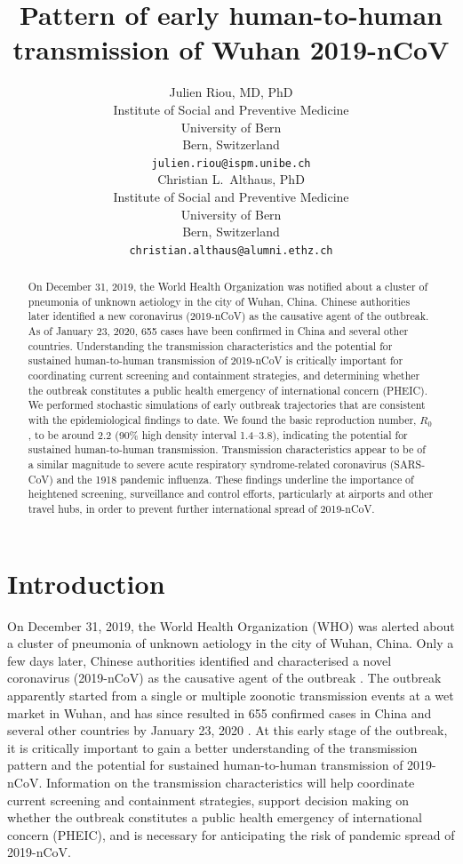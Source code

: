 \documentclass[a4]{article}
\title{Pattern of early human-to-human transmission of Wuhan 2019-nCoV}
\author{
   Julien Riou, MD, PhD \\
  Institute of Social and Preventive Medicine\\
  University of Bern\\
  Bern, Switzerland \\
  \texttt{julien.riou@ispm.unibe.ch} \\
  \And
Christian L.~Althaus, PhD \\
Institute of Social and Preventive Medicine\\
University of Bern\\
Bern, Switzerland \\
\texttt{christian.althaus@alumni.ethz.ch}
}
\begin{document}
\maketitle

\begin{abstract}
On December 31, 2019, the World Health Organization was notified about a cluster of pneumonia of unknown aetiology in the city of Wuhan, China. Chinese authorities later identified a new coronavirus (2019-nCoV) as the causative agent of the outbreak. As of January 23, 2020, 655 cases have been confirmed in China and several other countries. Understanding the transmission characteristics and the potential for sustained human-to-human transmission of 2019-nCoV is critically important for coordinating current screening and containment strategies, and determining whether the outbreak constitutes a public health emergency of international concern (PHEIC). We performed stochastic simulations of early outbreak trajectories that are consistent with the epidemiological findings to date. We found the basic reproduction number, $R_0$, to be around 2.2 (90\% high density interval 1.4--3.8), indicating the potential for sustained human-to-human transmission. Transmission characteristics appear to be of a similar magnitude to severe acute respiratory syndrome-related coronavirus (SARS-CoV) and the 1918 pandemic influenza. These findings underline the importance of heightened screening, surveillance and control efforts, particularly at airports and other travel hubs, in order to prevent further international spread of 2019-nCoV.
\end{abstract}

\section*{Introduction}

On December 31, 2019, the World Health Organization (WHO) was alerted about a cluster of pneumonia of unknown aetiology in the city of Wuhan, China\cite{who1}. Only a few days later, Chinese authorities identified and characterised a novel coronavirus (2019-nCoV) as the causative agent of the outbreak \cite{Shi:2020}. The outbreak apparently started from a single or multiple zoonotic transmission events at a wet market in Wuhan, and has since resulted in 655 confirmed cases in China and several other countries by January 23, 2020 \cite{wiki}. At this early stage of the outbreak, it is critically important to gain a better understanding of the transmission pattern and the potential for sustained human-to-human transmission of 2019-nCoV. Information on the transmission characteristics will help coordinate current screening and containment strategies, support decision making on whether the outbreak constitutes a public health emergency of international concern (PHEIC), and is necessary for anticipating the risk of pandemic spread of 2019-nCoV.
\end{document}
